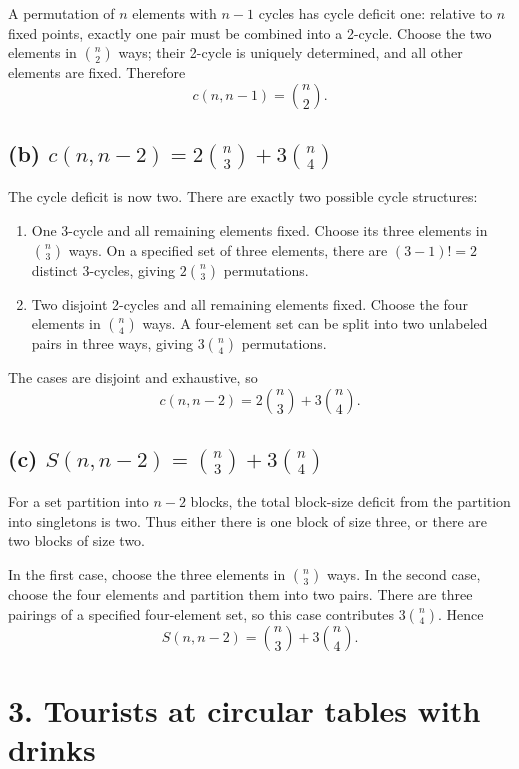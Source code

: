 \documentclass[11pt]{article}
\begin{document}
A permutation of \(n\) elements with \(n-1\) cycles has cycle deficit one:
relative to \(n\) fixed points, exactly one pair must be combined into a
2-cycle. Choose the two elements in \(\binom{n}{2}\) ways; their 2-cycle is
uniquely determined, and all other elements are fixed. Therefore
\[
    c(n,n-1)=\binom{n}{2}.
\]

\subsection*{(b) \(c(n,n-2)=2\binom{n}{3}+3\binom{n}{4}\)}

The cycle deficit is now two. There are exactly two possible cycle structures:

\begin{enumerate}[leftmargin=2em]
    \item One 3-cycle and all remaining elements fixed. Choose its three
    elements in \(\binom{n}{3}\) ways. On a specified set of three elements,
    there are \((3-1)!=2\) distinct 3-cycles, giving
    \(2\binom{n}{3}\) permutations.
    \item Two disjoint 2-cycles and all remaining elements fixed. Choose the
    four elements in \(\binom{n}{4}\) ways. A four-element set can be split
    into two unlabeled pairs in three ways, giving
    \(3\binom{n}{4}\) permutations.
\end{enumerate}

The cases are disjoint and exhaustive, so
\[
    c(n,n-2)=2\binom{n}{3}+3\binom{n}{4}.
\]

\subsection*{(c) \(S(n,n-2)=\binom{n}{3}+3\binom{n}{4}\)}

For a set partition into \(n-2\) blocks, the total block-size deficit from
the partition into singletons is two. Thus either there is one block of size
three, or there are two blocks of size two.

In the first case, choose the three elements in \(\binom{n}{3}\) ways. In the
second case, choose the four elements and partition them into two pairs. There
are three pairings of a specified four-element set, so this case contributes
\(3\binom{n}{4}\). Hence
\[
    S(n,n-2)=\binom{n}{3}+3\binom{n}{4}.
\]

\section*{3. Tourists at circular tables with drinks}
\end{document}
